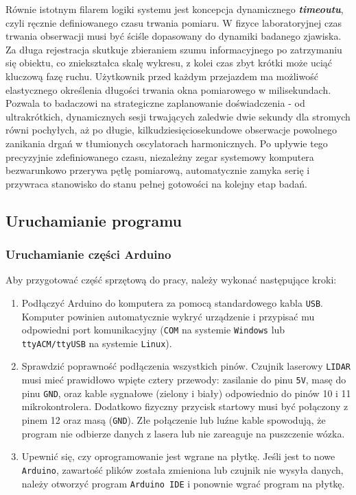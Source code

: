 \documentclass[a4paper,12pt]{article}
\begin{document}
\vspace{0.3cm}
\noindent Równie istotnym filarem logiki systemu jest koncepcja dynamicznego \textit{\textbf{timeoutu}}, czyli ręcznie definiowanego czasu trwania pomiaru. W fizyce laboratoryjnej czas trwania obserwacji musi być ściśle dopasowany do dynamiki badanego zjawiska. Za długa rejestracja skutkuje zbieraniem szumu informacyjnego po zatrzymaniu się obiektu, co zniekształca skalę wykresu, z kolei czas zbyt krótki może uciąć kluczową fazę ruchu. Użytkownik przed każdym przejazdem ma możliwość elastycznego określenia długości trwania okna pomiarowego w milisekundach. Pozwala to badaczowi na strategiczne zaplanowanie doświadczenia - od ultrakrótkich, dynamicznych sesji trwających zaledwie dwie sekundy dla stromych równi pochyłych, aż po długie, kilkudziesięciosekundowe obserwacje powolnego zanikania drgań w tłumionych oscylatorach harmonicznych. Po upływie tego precyzyjnie zdefiniowanego czasu, niezależny zegar systemowy komputera bezwarunkowo przerywa pętlę pomiarową, automatycznie zamyka serię i przywraca stanowisko do stanu pełnej gotowości na kolejny etap badań.



\subsection{Uruchamianie programu}

\subsubsection{Uruchamianie części Arduino}
Aby przygotować część sprzętową do pracy, należy wykonać następujące kroki:

\begin{enumerate}
    \item Podłączyć Arduino do komputera za pomocą standardowego kabla \texttt{USB}. Komputer powinien automatycznie wykryć urządzenie i przypisać mu odpowiedni port komunikacyjny (\texttt{COM} na systemie \texttt{Windows} lub \texttt{ttyACM/ttyUSB} na systemie \texttt{Linux}).
    \item Sprawdzić poprawność podłączenia wszystkich pinów. Czujnik laserowy \texttt{LIDAR} musi mieć prawidłowo wpięte cztery przewody: zasilanie do pinu \texttt{5V}, masę do pinu \texttt{GND}, oraz kable sygnałowe (zielony i biały) odpowiednio do pinów 10 i 11 mikrokontrolera. Dodatkowo fizyczny przycisk startowy musi być połączony z pinem 12 oraz masą (\texttt{GND}). Złe połączenie lub luźne kable spowodują, że program nie odbierze danych z lasera lub nie zareaguje na puszczenie wózka.
    \item Upewnić się, czy oprogramowanie jest wgrane na płytkę. Jeśli jest to nowe \texttt{Arduino}, zawartość plików została zmieniona lub czujnik nie wysyła danych, należy otworzyć program \texttt{Arduino IDE} i ponownie wgrać program na płytkę.
\end{enumerate}
\end{document}
